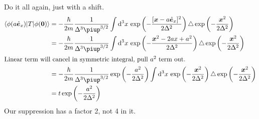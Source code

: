 \documentclass[11pt, english, fleqn, DIV=15, headinclude, BCOR=1.5cm]{scrartcl}
\begin{document}
Do it all again, just with a shift.
\begin{align*}
    \braket{\phi(a \ev_x) | T | \phi(\vec 0)}
    &= - \frac\hbar{2m} \frac1{\Delta^3 \piup^{3/2}}
    \int \dif^3 x \, \exp\del{-\frac{[\vec x - a \ev_x]^2}{2\Delta^2}} \laplace
    \exp\del{- \frac{\vec x^2}{2 \Delta^2}} \\
    &= - \frac\hbar{2m} \frac1{\Delta^3 \piup^{3/2}}
    \int \dif^3 x \, \exp\del{-\frac{\vec x^2 - 2 ax + a^2}{2\Delta^2}} \laplace
    \exp\del{- \frac{\vec x^2}{2 \Delta^2}} \\
    \intertext{%
        Linear term will cancel in symmetric integral, pull $a^2$ term out.
    }
    &= - \frac\hbar{2m} \frac1{\Delta^3 \piup^{3/2}} \exp\del{-\frac{a^2}{2\Delta^2}}
    \int \dif^3 x \, \exp\del{-\frac{\vec x^2}{2\Delta^2}} \laplace
    \exp\del{- \frac{\vec x^2}{2 \Delta^2}} \\
    &= t \exp\del{-\frac{a^2}{2\Delta^2}}
\end{align*}
Our suppression has a factor 2, not 4 in it.
\end{document}
